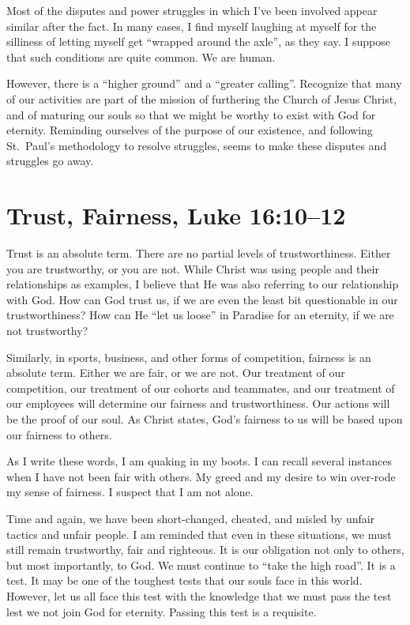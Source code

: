 \documentclass[12pt]{memoir}
\begin{document}
Most of the disputes and power struggles in which I've been involved
appear similar after the fact. In many cases, I find myself laughing
at myself for the silliness of letting myself get ``wrapped around
the axle'', as they say. I suppose that such conditions are quite
common. We are human. 

However, there is a ``higher ground'' and a ``greater calling''.
Recognize that many of our activities are part of the mission of furthering
the Church of Jesus Christ, and of maturing our souls so that we might
be worthy to exist with God for eternity. Reminding ourselves of the
purpose of our existence, and following St.~Paul's methodology to
resolve struggles, seems to make these disputes and struggles go away.

\section[Trust, Fairness]{Trust, Fairness, Luke 16:10--12}\label{trust-fairness-luke-1610-12}

Trust is an absolute term. There are no partial levels of trustworthiness.
Either you are trustworthy, or you are not. While Christ was using
people and their relationships as examples, I believe that He was
also referring to our relationship with God. How can God trust us,
if we are even the least bit questionable in our trustworthiness?
How can He ``let us loose'' in Paradise for an eternity, if we are
not trustworthy?

Similarly, in sports, business, and other forms of competition, fairness
is an absolute term. Either we are fair, or we are not. Our treatment
of our competition, our treatment of our cohorts and teammates, and
our treatment of our employees will determine our fairness and trustworthiness.
Our actions will be the proof of our soul. As Christ states, God's
fairness to us will be based upon our fairness to others. 

As I write these words, I am quaking in my boots. I can recall several
instances when I have not been fair with others. My greed and my desire
to win over-rode my sense of fairness. I suspect that I am not alone.

Time and again, we have been short-changed, cheated, and misled by
unfair tactics and unfair people. I am reminded that even in these
situations, we must still remain trustworthy, fair and righteous.
It is our obligation not only to others, but most importantly, to
God. We must continue to ``take the high road''. It is a test. It
may be one of the toughest tests that our souls face in this world.
However, let us all face this test with the knowledge that we must
pass the test lest we not join God for eternity. Passing this test
is a requisite. 
\end{document}
